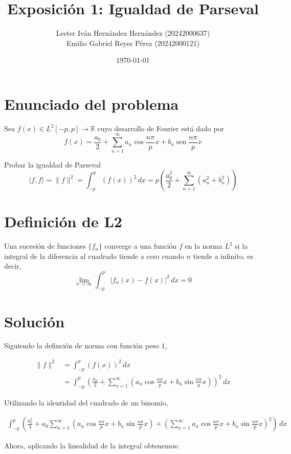 \documentclass[12pt,a4paper]{article}
\title{Exposición 1: Igualdad de Parseval}
\author{Lester Iván Hernández Hernández (20242000637)\\
        Emilio Gabriel Reyes Pérez (20242000121)}
\date{\today}
\begin{document}
\maketitle

\section{Enunciado del problema}

Sea $f(x) \in L^2[-p,p] \longrightarrow \mathbb{R}$ cuyo desarrollo de Fourier está dado por
\[
f(x) = \frac{a_0}{2} + \sum_{n=1}^{\infty} a_n \cos \frac{n\pi}{p}x + b_n \operatorname{sen} \frac{n\pi}{p}x
\]

Probar la igualdad de Parseval
\[
\langle f,f\rangle = \|f\|^2 = \int_{-p}^{p} (f(x))^2\,dx = p\left(\frac{a_0^2}{2} + \sum_{n=1}^{\infty} (a_n^2 + b_n^2)\right)
\]

\section{Definición de L2}
Una sucesión de funciones $\{f_n\}$ converge a una función $f$ en la norma $L^2$ si la integral de la diferencia al cuadrado tiende a cero cuando $n$ tiende a infinito, es decir,
\[
\lim_{n \to \infty} \int_{-p}^{p} |f_n(x) - f(x)|^2 \, dx = 0
\]

\section{Solución}

Siguiendo la definción de norma con función peso $1$, 

\begin{align*}
\|f\|^2 &= \int_{-p}^{p} (f(x))^2 \, dx \\
&= \int_{-p}^{p} \left( \frac{a_0}{2} + \sum_{n=1}^{\infty} \left(a_n \cos \frac{n\pi}{p}x + b_n \sin \frac{n\pi}{p}x \right)\right)^2 \, dx 
\end{align*}

Utilizando la identidad del cuadrado de un binomio,

\begin{align*}
\int_{-p}^{p} \left(\frac{a_0^2}{4} + a_0\sum_{n=1}^{\infty} \left(a_n \cos \frac{n\pi}{p}x + b_n \sin \frac{n\pi}{p}x \right) + \left(\sum_{n=1}^{\infty} a_n \cos \frac{n\pi}{p}x + b_n \sin \frac{n\pi}{p}x \right)^2 \right) \, dx
\end{align*}

Ahora, aplicando la linealidad de la integral obtenemos:
\end{document}
